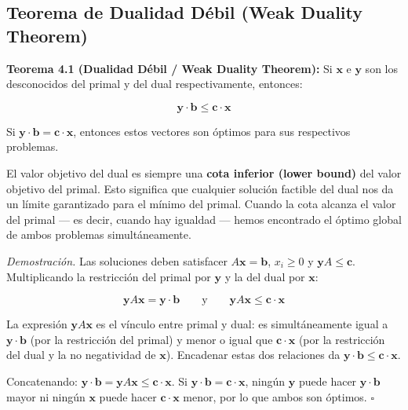 \documentclass[12pt]{article}
\begin{document}
\subsection{Teorema de Dualidad D\'ebil (Weak Duality Theorem)}

\textbf{Teorema 4.1 (Dualidad D\'ebil / Weak Duality Theorem):} Si $\mathbf{x}$
e $\mathbf{y}$ son los desconocidos del primal y del dual respectivamente,
entonces:

\begin{equation}
  \mathbf{y} \cdot \mathbf{b} \leq \mathbf{c} \cdot \mathbf{x}
\end{equation}

Si $\mathbf{y} \cdot \mathbf{b} = \mathbf{c} \cdot \mathbf{x}$, entonces
estos vectores son \'optimos para sus respectivos problemas.

\begin{intuicionmat}
El valor objetivo del dual es siempre una \textbf{cota inferior (lower bound)}
del valor objetivo del primal. Esto significa que cualquier soluci\'on factible
del dual nos da un l\'imite garantizado para el m\'inimo del primal. Cuando
la cota alcanza el valor del primal --- es decir, cuando hay igualdad ---
hemos encontrado el \'optimo global de ambos problemas simult\'aneamente.
\end{intuicionmat}

\textit{Demostraci\'on.} Las soluciones deben satisfacer $A\mathbf{x} = \mathbf{b}$,
$x_i \geq 0$ y $\mathbf{y}A \leq \mathbf{c}$. Multiplicando la restricci\'on
del primal por $\mathbf{y}$ y la del dual por $\mathbf{x}$:

\begin{equation}
  \mathbf{y}A\mathbf{x} = \mathbf{y} \cdot \mathbf{b}
  \qquad \text{y} \qquad
  \mathbf{y}A\mathbf{x} \leq \mathbf{c} \cdot \mathbf{x}
\end{equation}

\begin{intuicionmat}
La expresi\'on $\mathbf{y}A\mathbf{x}$ es el v\'inculo entre primal y dual:
es simult\'aneamente igual a $\mathbf{y} \cdot \mathbf{b}$ (por la restricci\'on
del primal) y menor o igual que $\mathbf{c} \cdot \mathbf{x}$ (por la restricci\'on
del dual y la no negatividad de $\mathbf{x}$). Encadenar estas dos relaciones
da $\mathbf{y} \cdot \mathbf{b} \leq \mathbf{c} \cdot \mathbf{x}$.
\end{intuicionmat}

Concatenando: $\mathbf{y} \cdot \mathbf{b} = \mathbf{y}A\mathbf{x} \leq \mathbf{c} \cdot \mathbf{x}$.
Si $\mathbf{y} \cdot \mathbf{b} = \mathbf{c} \cdot \mathbf{x}$, ning\'un
$\mathbf{y}$ puede hacer $\mathbf{y} \cdot \mathbf{b}$ mayor ni ning\'un
$\mathbf{x}$ puede hacer $\mathbf{c} \cdot \mathbf{x}$ menor, por lo que
ambos son \'optimos. $\square$
\end{document}
